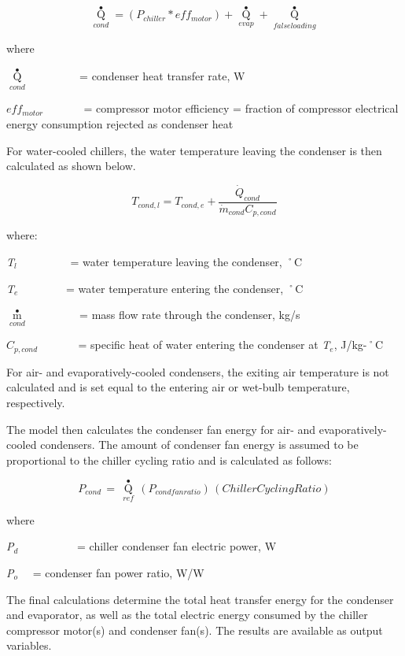 \begin{equation}
{\mathop Q\limits^ \bullet_{cond}} = \left( {{P_{chiller}} * ef{f_{motor}}} \right) + {\mathop Q\limits^ \bullet_{evap}} + {\mathop Q\limits^ \bullet_{falseloading}}
\end{equation}

where

\({\mathop Q\limits^ \bullet_{cond}}\) ~~~~~~~~ = condenser heat transfer rate, W

\(ef{f_{motor}}\) ~~~~~~ = compressor motor efficiency = fraction of compressor electrical energy consumption rejected as condenser heat

For water-cooled chillers, the water temperature leaving the condenser is then calculated as shown below.

\begin{equation} 
  T_{cond,l} = T_{cond,e} + \frac{\dot{Q}_{cond}}{\dot{m}_{cond}C_{p,cond}}
\end{equation}

where:

\emph{T\(_{l}\)}~~~~~~~~~ = water temperature leaving the condenser, ˚C

\emph{T\(_{e}\)}~~~~~~~~ = water temperature entering the condenser, ˚C

\({\mathop m\limits^ \bullet_{cond}}\) ~~~~~~~~ = mass flow rate through the condenser, kg/s

\({C_{p,cond}}\) ~~~~~~ = specific heat of water entering the condenser at \emph{T\(_{e}\)}, J/kg-˚C

For air- and evaporatively-cooled condensers, the exiting air temperature is not calculated and is set equal to the entering air or wet-bulb temperature, respectively.

The model then calculates the condenser fan energy for air- and evaporatively-cooled condensers. The amount of condenser fan energy is assumed to be proportional to the chiller cycling ratio and is calculated as follows:

\begin{equation}
{P_{cond}}\, = \,{\mathop Q\limits^ \bullet_{ref}}\,\left( {{P_{condfanratio}}} \right)\,\left( {ChillerCyclingRatio} \right)
\end{equation}

where

\emph{P\(_{d}\)}~~~~~~~~~~ = chiller condenser fan electric power, W

\emph{P\(_{o}\)}~~ = condenser fan power ratio, W/W

The final calculations determine the total heat transfer energy for the condenser and evaporator, as well as the total electric energy consumed by the chiller compressor motor(s) and condenser fan(s). The results are available as output variables.

